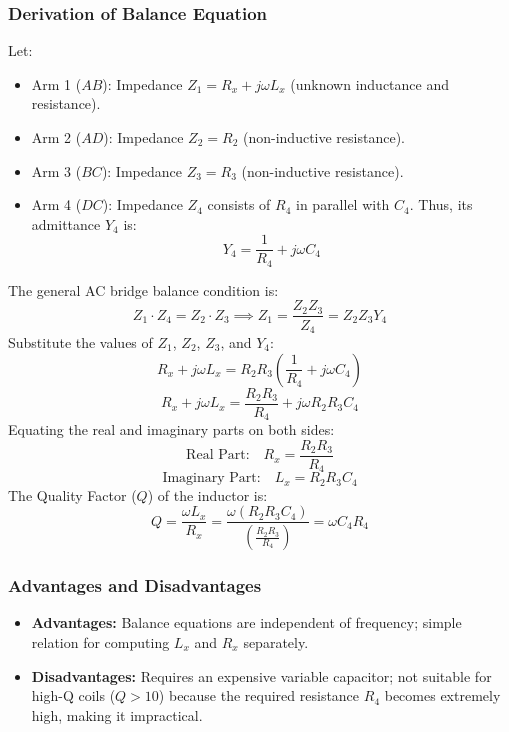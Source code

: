 \documentclass[12pt,a4paper]{article}
\begin{document}
\subsubsection{Derivation of Balance Equation}
Let:
\begin{itemize}[leftmargin=*, itemsep=3pt]
  \item Arm 1 ($AB$): Impedance $Z_1 = R_x + j\omega L_x$ (unknown inductance and resistance).
  \item Arm 2 ($AD$): Impedance $Z_2 = R_2$ (non-inductive resistance).
  \item Arm 3 ($BC$): Impedance $Z_3 = R_3$ (non-inductive resistance).
  \item Arm 4 ($DC$): Impedance $Z_4$ consists of $R_4$ in parallel with $C_4$. Thus, its admittance $Y_4$ is:
    \begin{equation}
      Y_4 = \frac{1}{R_4} + j\omega C_4
    \end{equation}
\end{itemize}
The general AC bridge balance condition is:
\begin{equation}
  Z_1 \cdot Z_4 = Z_2 \cdot Z_3 \implies Z_1 = \frac{Z_2 Z_3}{Z_4} = Z_2 Z_3 Y_4
\end{equation}
Substitute the values of $Z_1$, $Z_2$, $Z_3$, and $Y_4$:
\begin{equation}
  R_x + j\omega L_x = R_2 R_3 \left( \frac{1}{R_4} + j\omega C_4 \right)
\end{equation}
\begin{equation}
  R_x + j\omega L_x = \frac{R_2 R_3}{R_4} + j\omega R_2 R_3 C_4
\end{equation}
Equating the real and imaginary parts on both sides:
\begin{equation}
  \text{Real Part:} \quad R_x = \frac{R_2 R_3}{R_4}
\end{equation}
\begin{equation}
  \text{Imaginary Part:} \quad L_x = R_2 R_3 C_4
\end{equation}
The Quality Factor ($Q$) of the inductor is:
\begin{equation}
  Q = \frac{\omega L_x}{R_x} = \frac{\omega (R_2 R_3 C_4)}{\left(\frac{R_2 R_3}{R_4}\right)} = \omega C_4 R_4
\end{equation}

\subsubsection{Advantages and Disadvantages}
\begin{itemize}[leftmargin=*, itemsep=3pt]
  \item \textbf{Advantages:} Balance equations are independent of frequency; simple relation for computing $L_x$ and $R_x$ separately.
  \item \textbf{Disadvantages:} Requires an expensive variable capacitor; not suitable for high-Q coils ($Q > 10$) because the required resistance $R_4$ becomes extremely high, making it impractical.
\end{itemize}
\end{document}
